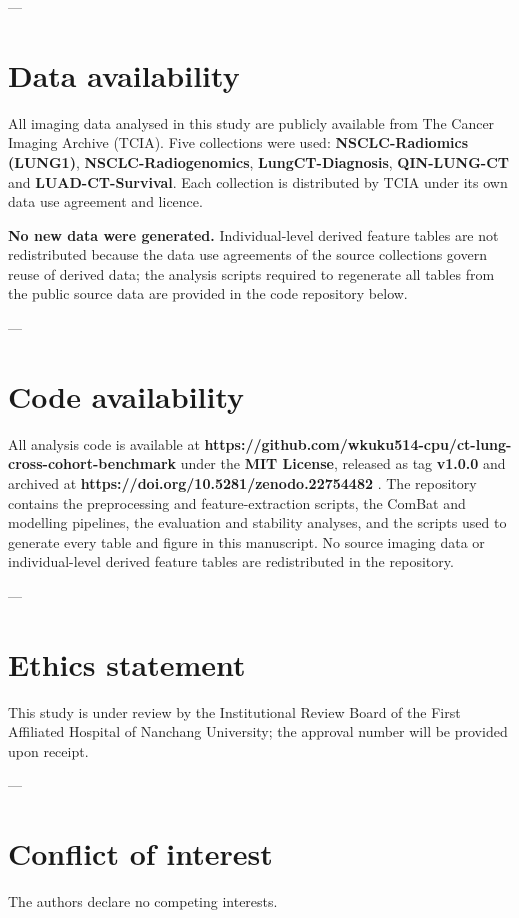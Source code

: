 \documentclass[a4paper,fleqn]{cas-sc}
\begin{document}
---

\section*{Data availability}
All imaging data analysed in this study are publicly available from The Cancer Imaging Archive (TCIA). Five collections were used: \textbf{NSCLC-Radiomics (LUNG1)}, \textbf{NSCLC-Radiogenomics}, \textbf{LungCT-Diagnosis}, \textbf{QIN-LUNG-CT} and \textbf{LUAD-CT-Survival}. Each collection is distributed by TCIA under its own data use agreement and licence.

\textbf{No new data were generated.} Individual-level derived feature tables are not redistributed because the data use agreements of the source collections govern reuse of derived data; the analysis scripts required to regenerate all tables from the public source data are provided in the code repository below.

---

\section*{Code availability}
All analysis code is available at \textbf{https://github.com/wkuku514-cpu/ct-lung-cross-cohort-benchmark} under the \textbf{MIT License}, released as tag \textbf{v1.0.0} and archived at \textbf{https://doi.org/10.5281/zenodo.22754482} \citep{wang2026software}. The repository contains the preprocessing and feature-extraction scripts, the ComBat and modelling pipelines, the evaluation and stability analyses, and the scripts used to generate every table and figure in this manuscript. No source imaging data or individual-level derived feature tables are redistributed in the repository.

---

\section*{Ethics statement}
This study is under review by the Institutional Review Board of the First Affiliated Hospital of Nanchang University; the approval number will be provided upon receipt.

---

\section*{Conflict of interest}
The authors declare no competing interests.
\end{document}
